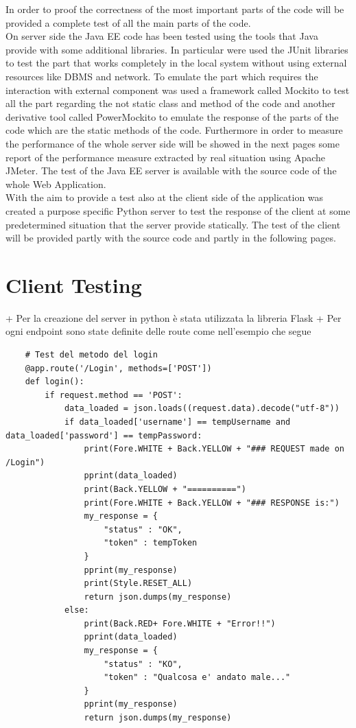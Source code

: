 \documentclass[numbers=noenddot, 12pt, a4paper, oneside]{scrbook}
\begin{document}
In order to proof the correctness of the most important parts of the code will be provided a complete test of all the main parts of the code. \\\newline
On server side the Java EE code has been tested using the tools that Java provide with some additional libraries. In particular were used the JUnit libraries to test the part that works completely in the local system without using external resources like DBMS and network.
To emulate the part which requires the interaction with external component was used a framework called Mockito to test all the part regarding the not static class and method of the code and another derivative tool called PowerMockito to emulate the response of the parts of the code which are the static methods of the code. 
Furthermore in order to measure the performance of the whole server side will be showed in the next pages some report of the performance measure extracted by real situation using Apache JMeter. 
The test of the Java EE server is available with the source code of the whole Web Application. \\\newline
With the aim to provide a test also at the client side of the application was created a purpose specific Python server to test the response of the client at some predetermined situation that the server provide statically. 
The test of the client will be provided partly with the source code and partly in the following pages. \\\newpage


\section*{Client Testing}

+	Per la creazione del server in python è stata utilizzata la libreria Flask
+	Per ogni endpoint sono state definite delle route come nell'esempio che segue

\lstset{language=Python}
\begin{lstlisting}
	# Test del metodo del login
	@app.route('/Login', methods=['POST'])
	def login():
		if request.method == 'POST':
			data_loaded = json.loads((request.data).decode("utf-8"))
			if data_loaded['username'] == tempUsername and data_loaded['password'] == tempPassword:
				print(Fore.WHITE + Back.YELLOW + "### REQUEST made on /Login")
				pprint(data_loaded)
				print(Back.YELLOW + "==========")
				print(Fore.WHITE + Back.YELLOW + "### RESPONSE is:")
				my_response = {
					"status" : "OK",
					"token" : tempToken
				}
				pprint(my_response)
				print(Style.RESET_ALL)
				return json.dumps(my_response)
			else:
				print(Back.RED+ Fore.WHITE + "Error!!")
				pprint(data_loaded)
				my_response = {
					"status" : "KO",
					"token" : "Qualcosa e' andato male..."
				}
				pprint(my_response)
				return json.dumps(my_response)
\end{lstlisting}
\end{document}

